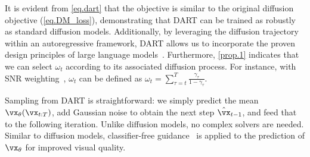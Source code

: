 It is evident from \cref{eq.dart} that the objective is similar to the original diffusion objective (\cref{eq.DM_loss}), demonstrating that DART can be trained as robustly as standard diffusion models. Additionally, by leveraging the diffusion trajectory within an autoregressive framework, DART allows us to incorporate the proven design principles of large language models~\citep{gpt3, dubey2024llama}.
Furthermore, \cref{prop.1} indicates that we can select $\omega_t$ according to its associated diffusion process. For instance, with SNR weighting~\citep{ho2020denoising}, $\omega_t$ can be defined as $\omega_t = \sum_{\tau=t}^T \frac{\gamma_\tau}{1-\gamma_\tau}$.

    
Sampling from DART is straightforward: we simply predict the mean $\vx_\theta(\vx_{t:T})$, add Gaussian noise to obtain the next step $\hat{\vx}_{t-1}$, and feed that to the following iteration. Unlike diffusion models, no complex solvers are needed. Similar to diffusion models, classifier-free guidance~\cite[CFG,][]{ho2021classifier} is applied to the prediction of $\vx_\theta$ for improved visual quality.